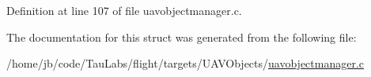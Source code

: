 \-Definition at line 107 of file uavobjectmanager.\-c.



\-The documentation for this struct was generated from the following file\-:\begin{DoxyCompactItemize}
\item 
/home/jb/code/\-Tau\-Labs/flight/targets/\-U\-A\-V\-Objects/\hyperlink{uavobjectmanager_8c}{uavobjectmanager.\-c}\end{DoxyCompactItemize}
